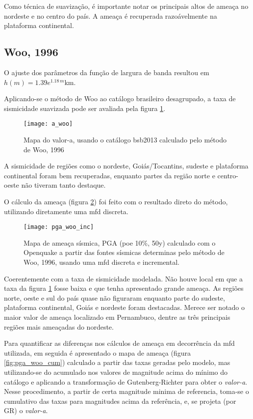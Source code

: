 Como técnica de suavização, é importante notar os principais altos de ameaça no nordeste e no centro do país.
A ameaça é recuperada razoávelmente na plataforma continental.

\subsection{Woo, 1996}
\label{sec:woo_resultados}

O ajuste dos parâmetros da função de largura de banda resultou em $h(m)=1.39e^{1.18\,m}$km.

Aplicando-se o método de Woo ao catálogo brasileiro desagrupado, a taxa de sismicidade suavizada 
pode ser avaliada pela figura \ref{fig:a_woo}.

\begin{figure}[H]
  \centering
  \texttt{[image: a\_woo]} 
  \caption{Mapa do valor-a, usando o catálogo \gls{bsb2013} calculado pelo método de Woo, 1996 }
  \label{fig:a_woo} 
\end{figure}

A sismicidade de regiões como o nordeste, Goiás/Tocantins, sudeste e plataforma continental 
foram bem recuperadas, enquanto partes da região norte e centro-oeste não tiveram tanto destaque. 

O cálculo da ameaça (figura \ref{fig:pga_woo_inc}) foi feito com o resultado direto do método, utilizando
diretamente uma \gls{mfd} discreta.
\begin{figure}[H]
  \centering
  \texttt{[image: pga\_woo\_inc]} 
  \caption{Mapa de ameaça sísmica, PGA (poe 10\%, 50y) 
  		   calculado com o Openquake a partir das fontes sísmicas
  		   determinas pelo método de Woo, 1996, usando uma \gls{mfd}
  		   discreta e incremental.
  }
  \label{fig:pga_woo_inc} 
\end{figure}

Coerentemente com a taxa de sismicidade modelada. Não houve local em que a taxa
da figura \ref{fig:a_woo} fosse baixa e que tenha apresentado grande ameaça.
As regiões norte, oeste e sul do país quase não figuraram 
enquanto parte do sudeste, plataforma continental, Goiás e nordeste foram
destacadas. Merece ser notado o maior valor de ameaça localizado em Pernambuco, dentre as três principais regiões mais ameaçadas do nordeste.

Para quantificar as diferenças nos cálculos de ameaça em decorrência da \gls{mfd} utilizada, em seguida é apresentado o
mapa de ameaça (figura \ref{fig:pga_woo_cum}) calculado a partir das taxas geradas pelo modelo, mas utilizando-se do
acumulado nos valores de magnitude acima do mínimo do catálogo e aplicando a transformação de Gutenberg-Richter 
para obter o \emph{valor-a}. Nesse procedimento, a partir de certa magnitude minima de referencia, toma-se o cumulativo
das taxas para magnitudes acima da referência, e, se projeta (por \gls{GR}) o \emph{valor-a}.


